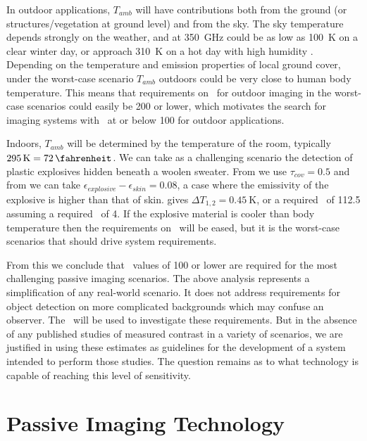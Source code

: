 In outdoor applications, $T_{amb}$ will have contributions both from the ground (or structures/vegetation at ground level) and from the sky.
The sky temperature depends strongly on the weather, and at \SI{350}{\GHz} could be as low as \SI{100}{\K} on a clear winter day, or approach \SI{310}{\K} on a hot day with high humidity \cite{appleby_standoff_2007}.
Depending on the temperature and emission properties of local ground cover, under the worst-case scenario $T_{amb}$ outdoors could be very close to human body temperature.
This means that requirements on \NETD\ for outdoor imaging in the worst-case scenarios could easily be \SI{200}{\mK} or lower, which motivates the search for imaging systems with \NETD\ at or below \SI{100}{\mK} for outdoor applications. 

Indoors, $T_{amb}$ will be determined by the temperature of the room, typically $\SI{295}{\K} = \SI{72}{\fahrenheit}$.
We can take as a challenging scenario the detection of plastic explosives hidden beneath a woolen sweater.
From \cite{bjarnason_millimeter-wave_2004} we use $\tau_{cov} = 0.5$ and from \cite{appleby_standoff_2007} we can take $\epsilon_{explosive} - \epsilon_{skin} = 0.08$, a case where the emissivity of the explosive is higher than that of skin.
 gives $\Delta T_{1,2} = \SI{0.45}{\K}$, or a required \NETD\ of \SI{112.5}{\mK} assuming a required \SN\ of 4.
If the explosive material is cooler than body temperature then the requirements on \NETD\ will be eased, but it is the worst-case scenarios that should drive system requirements.

From this we conclude that \NETD\ values of \SI{100}{\mK} or lower are required for the most challenging passive imaging scenarios.
The above analysis represents a simplification of any real-world scenario.
It does not address requirements for object detection on more complicated backgrounds which may confuse an observer.
The \Imager\ will be used to investigate these requirements.
But in the absence of any published studies of measured contrast in a variety of scenarios, we are justified in using these estimates as guidelines for the development of a system intended to perform those studies.
The question remains as to what technology is capable of reaching this level of sensitivity.

\section{Passive Imaging Technology} \label{sec:ch1-passive-tech}

